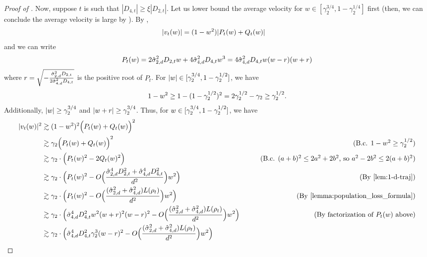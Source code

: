 \begin{proof}[Proof of ]
Now, suppose $t$ is such that $|D_{4, t}| \geq \xi |D_{2, t}|$. Let us lower bound the average velocity for $w \in [\gamma_2^{3/4}, 1 - \gamma_2^{1/4}]$ first (then, we can conclude the average velocity is large by ). By ,
\begin{align}
|v_t(w)|
& = (1 - w^2) |P_t(w) + Q_t(w)|
\end{align}
and we can write
\begin{align}
P_t(w) 
 = 2 \hat{\sigma}_{2, d}^2 D_{2, t} w + 4\hat{\sigma}_{4, d}^2 D_{4, t} w^3 
 = 4 \hat{\sigma}_{4, d}^2 D_{4, t} w (w - r) (w + r)
\end{align}
where $r = \sqrt{-\frac{\hat{\sigma}_{2, d}^2 D_{2, t}}{2 \hat{\sigma}_{4, d}^2 D_{4, t}}}$ is the positive root of $P_t$. For $|w| \in [\gamma_2^{3/4}, 1 - \gamma_2^{1/2}]$, we have 
\begin{align}
1 - w^2 \geq 1 - (1 - \gamma_2^{1/2})^2 = 2 \gamma_2^{1/2} - \gamma_2 \geq \gamma_2^{1/2}.
\end{align}
Additionally, $|w| \geq \gamma_2^{3/4}$ and $|w + r| \geq \gamma_2^{3/4}$. Thus, for $w \in [\gamma_2^{3/4}, 1 -\gamma_2^{1/2}]$, we have
\begin{align}
|\vel_t(\w)|^2
& \gtrsim (1 - \w^2)^2 \Big(P_t(\w) + Q_t(\w)\Big)^2 \label{eq:start} \\
& \gtrsim \gamma_2 \Big(P_t(\w) + Q_t(\w)\Big)^2
& \tag{B.c. $1 - \w^2 \geq \gamma_2^{1/2}$} \\
& \gtrsim \gamma_2 \cdot \Big( P_t(\w)^2 - 2 Q_t(\w)^2 \Big)
& \tag{B.c. $(a + b)^2 \leq 2a^2 + 2b^2$, so $a^2 - 2b^2 \leq 2(a + b)^2$} \\
& \gtrsim \gamma_2 \cdot \Big( P_t(\w)^2 - O\Big(\frac{\sigmaCoeffTwo^4 D_{2, t}^2 + \sigmaCoeffFour^4 D_{4, t}^2}{d^2}\Big) w^2 \Big)
& \tag{By \Cref{lem:1-d-traj}} \\
& \gtrsim \gamma_2 \cdot \Big( P_t(\w)^2 - O\Big(\frac{(\sigmaCoeffTwo^2 + \sigmaCoeffFour^2) L(\rho_t)}{d^2}\Big) \w^2 \Big) 
& \tag{By \Cref{lemma:population_loss_formula}} \\
& \gtrsim \gamma_2 \cdot \Big(\sigmaCoeffFour^4 D_{4, t}^2 \w^2 (\w + r)^2 (\w - r)^2 - O\Big(\frac{(\sigmaCoeffTwo^2 + \sigmaCoeffFour^2) L(\rho_t)}{d^2}\Big) \w^2 \Big) 
& \tag{By factorization of $P_t(\w)$ above} \\
& \gtrsim \gamma_2 \cdot \Big(\sigmaCoeffFour^4 D_{4, t}^2 \gamma_2^3 (\w - r)^2 - O\Big(\frac{(\sigmaCoeffTwo^2 + \sigmaCoeffFour^2) L(\rho_t)}{d^2}\Big)\w^2 \Big)
& \label{eq:velocity_in_middle_case_1}
\end{align}

\end{proof}
